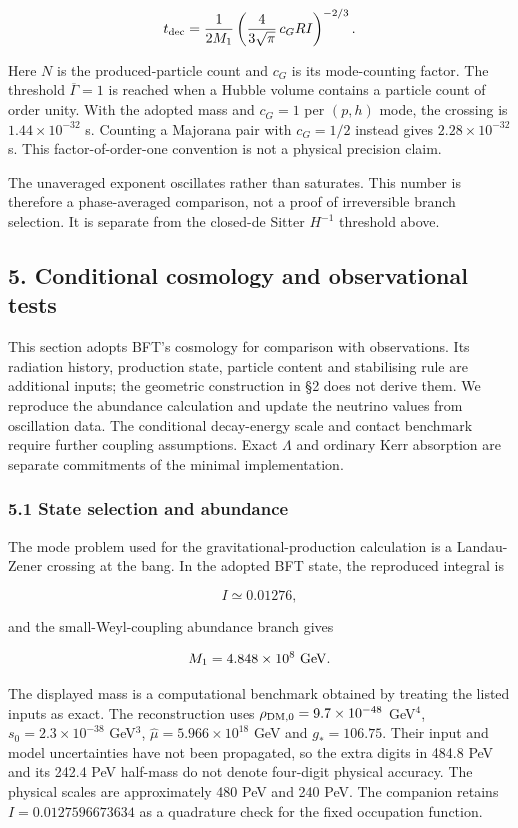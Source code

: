 \documentclass[
]{article}
\begin{document}
\[
t_{\rm dec}=\frac{1}{2M_1}
\left(\frac{4}{3\sqrt\pi}\,c_GRI\right)^{-2/3}.
\]

Here \(N\) is the produced-particle count and \(c_G\) is its
mode-counting factor. The threshold \(\overline\Gamma=1\) is reached
when a Hubble volume contains a particle count of order unity. With the
adopted mass and \(c_G=1\) per \((p,h)\) mode, the crossing is
\(1.44\times10^{-32}\) s. Counting a Majorana pair with \(c_G=1/2\)
instead gives \(2.28\times10^{-32}\) s. This factor-of-order-one
convention is not a physical precision claim.

The unaveraged exponent oscillates rather than saturates. This number is
therefore a phase-averaged comparison, not a proof of irreversible
branch selection. It is separate from the closed-de Sitter \(H^{-1}\)
threshold above.

\subsection{5. Conditional cosmology and observational
tests}\label{conditional-cosmology-and-observational-tests}

This section adopts BFT's cosmology for comparison with observations.
Its radiation history, production state, particle content and
stabilising rule are additional inputs; the geometric construction in §2
does not derive them. We reproduce the abundance calculation and update
the neutrino values from oscillation data. The conditional decay-energy
scale and contact benchmark require further coupling assumptions. Exact
\(\Lambda\) and ordinary Kerr absorption are separate commitments of the
minimal implementation.

\subsubsection{5.1 State selection and
abundance}\label{state-selection-and-abundance}

The mode problem used for the gravitational-production calculation is a
Landau-Zener crossing at the bang. In the adopted BFT state, the
reproduced integral is

\[
I\simeq0.01276,
\]

and the small-Weyl-coupling abundance branch gives

\[
M_1=4.848\times10^8\ {\rm GeV}.
\]

The displayed mass is a computational benchmark obtained by treating the
listed inputs as exact. The reconstruction uses
\(\rho_{\rm DM,0}=9.7\times10^{-48}\) GeV\(^4\),
\(s_0=2.3\times10^{-38}\) GeV\(^3\), \(\widehat\mu=5.966\times10^{18}\)
GeV and \(g_*=106.75\). Their input and model uncertainties have not
been propagated, so the extra digits in 484.8 PeV and its 242.4 PeV
half-mass do not denote four-digit physical accuracy. The physical
scales are approximately 480 PeV and 240 PeV. The companion retains
\(I=0.0127596673634\) as a quadrature check for the fixed occupation
function.
\end{document}
